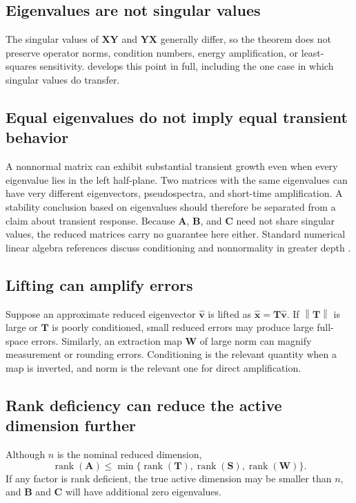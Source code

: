 \documentclass[11pt]{article}
\newcommand{\mat}[1]{\mathbf{#1}}
\newcommand{\vect}[1]{\mathbf{#1}}
\newcommand{\rank}{\operatorname{rank}}
\newcommand{\norm}[1]{\left\lVert #1\right\rVert}
\theoremstyle{definition}
\theoremstyle{remark}
\begin{document}
\subsection{Eigenvalues are not singular values}

The singular values of \(\mat{X}\mat{Y}\) and \(\mat{Y}\mat{X}\) generally differ, so the theorem does not preserve operator norms, condition numbers, energy amplification, or least-squares sensitivity.  develops this point in full, including the one case in which singular values do transfer.

\subsection{Equal eigenvalues do not imply equal transient behavior}

A nonnormal matrix can exhibit substantial transient growth even when every eigenvalue lies in the left half-plane. Two matrices with the same eigenvalues can have very different eigenvectors, pseudospectra, and short-time amplification. A stability conclusion based on eigenvalues should therefore be separated from a claim about transient response. Because \(\mat{A}\), \(\mat{B}\), and \(\mat{C}\) need not share singular values, the reduced matrices carry no guarantee here either. Standard numerical linear algebra references discuss conditioning and nonnormality in greater depth \parencite{trefethen1997numerical,golub2013matrix}.

\subsection{Lifting can amplify errors}

Suppose an approximate reduced eigenvector \(\widehat{\vect{v}}\) is lifted as
\(\widehat{\vect{x}}=\mat{T}\widehat{\vect{v}}\). If \(\norm{\mat{T}}\) is large or \(\mat{T}\) is poorly conditioned, small reduced errors may produce large full-space errors. Similarly, an extraction map \(\mat{W}\) of large norm can magnify measurement or rounding errors. Conditioning is the relevant quantity when a map is inverted, and norm is the relevant one for direct amplification.

\subsection{Rank deficiency can reduce the active dimension further}

Although \(n\) is the nominal reduced dimension,
\begin{equation}
  \rank(\mat{A})
  \leq
  \min\{\rank(\mat{T}),\rank(\mat{S}),\rank(\mat{W})\}.
  \label{eq:rank-further}
\end{equation}
If any factor is rank deficient, the true active dimension may be smaller than \(n\), and \(\mat{B}\) and \(\mat{C}\) will have additional zero eigenvalues.
\end{document}
